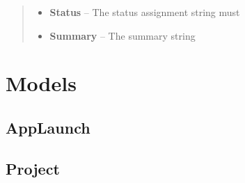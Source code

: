 \documentclass[letterpaper,10pt,english]{sphinxmanual}
\begin{document}
\begin{fulllineitems}
\begin{fulllineitems}
\begin{quote}
\begin{description}
\begin{itemize}
\item {} 
\textbf{Status} -- The status assignment string must

\item {} 
\textbf{Summary} -- The summary string

\end{itemize}

\end{description}\end{quote}

\end{fulllineitems}


\end{fulllineitems}



\section{Models}
\label{Available modules:models}

\subsection{AppLaunch}
\label{Available modules:applaunch}

\subsection{Project}
\label{Available modules:project}
\end{document}
